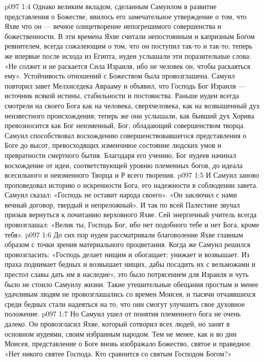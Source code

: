 \vs p097 1:4 Однако великим вкладом, сделанным Самуилом в развитие представления о Божестве, явилось его замечательное утверждение о том, что Яхве  что он --- вечное олицетворение непогрешимого совершенства и божественности. В эти времена Яхве считали непостоянным и капризным Богом ревнителем, всегда сожалеющим о том, что он поступил так\hyp{}то и так\hyp{}то; теперь же впервые после исхода из Египта, иудеи услышали эти поразительные слова: «Не солжет и не раскается Сила Израиля, ибо не человек он, чтобы раскаяться ему». Устойчивость отношений с Божеством была провозглашена. Самуил повторил завет Мелхиседека Аврааму и объявил, что Господь Бог Израиля --- источник всякой истины, стабильности и постоянства. Раньше иудеи всегда смотрели на своего Бога как на человека, сверхчеловека, как на возвышенный дух неизвестного происхождения; теперь же они услышали, как бывший дух Хорива превозносится как Бог неизменный, Бог, обладающий совершенством творца. Самуил способствовал восхождению совершенствовавшегося представления о Боге до высот, превосходящих изменчивое состояние людских умов и превратности смертного бытия. Благодаря его учению, Бог иудеев начинал восхождение от идеи, соответствующей уровню племенных богов, до идеала всесильного и неизменного Творца и Р всего творения.
\vs p097 1:5 И Самуил заново проповедовал историю о искренности Бога, его надежности в соблюдении завета. Самуил сказал: «Господь не оставит народа своего». «Он заключил с нами вечный договор, твердый и непреложный». И так по всей Палестине звучал призыв вернуться к почитанию верховного Яхве. Сей энергичный учитель всегда провозглашал: «Велик ты, Господь Бог, ибо нет подобного тебе и нет Бога, кроме тебя».
\vs p097 1:6 \pc До сих пор иудеи рассматривали благоволение Яхве главным образом с точки зрения материального процветания. Когда же Самуил решился провозгласить: «Господь делает нищим и обогащает; унижает и возвышает. Из праха поднимает бедных и возвышает нищих, дабы посадить их с вельможами и престол славы дать им в наследие», это было потрясением для Израиля и чуть было не стоило Самуилу жизни. Такие утешительные обещания простым и менее удачливым людям не провозглашались со времен Моисея, и тысячи отчаявшихся среди бедных стали надеяться на то, что они смогут улучшить свое духовное положение.
\vs p097 1:7 Но Самуил ушел от понятия племенного бога не очень далеко. Он провозгласил Яхве, который сотворил всех людей, но занят в основном иудеями, своим избранным народом. Тем не менее, как и во дни Моисея, представление о Боге вновь изображало Божество, святое и праведное. «Нет никого святее Господа. Кто сравнится со святым Господом Богом?»
